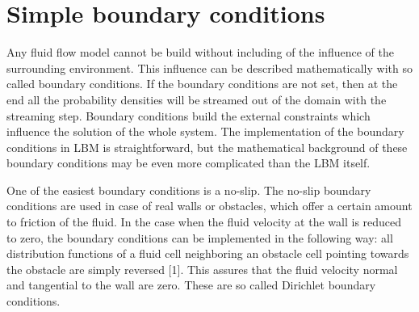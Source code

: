 
\section{Simple boundary conditions}

Any fluid flow model cannot be build without including of the influence of the surrounding environment. This influence can be described mathematically with so called boundary conditions. If the boundary conditions are not set, then at the end all the probability densities will be streamed out of the domain with the streaming step. Boundary conditions build the external constraints which influence the solution of the whole system. The implementation of the boundary conditions in LBM is straightforward, but the mathematical background of these boundary conditions may be even more complicated than the LBM itself.

One of the easiest boundary conditions is a no-slip. The no-slip boundary conditions are used in case of real walls or obstacles, which offer a certain amount to friction of the fluid. In the case when the fluid velocity at the wall is reduced to zero, the boundary conditions can be implemented in the following way: all distribution functions of a fluid cell neighboring an obstacle cell pointing towards the obstacle are simply reversed [1]. This assures that the fluid velocity normal and tangential to the wall are zero. These are so called Dirichlet boundary conditions.

